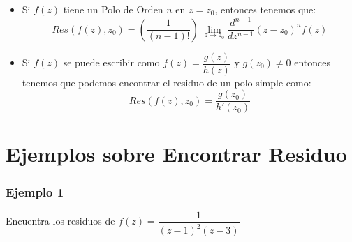 \documentclass[12pt, fleqn]{report}                             %
\newenvironment{SmallIndentation}[1][0.75em]                    %
        {\begin{adjustwidth}{#1}{}\begin{footnotesize}}             %
        {\end{footnotesize}\end{adjustwidth}}                       %
\theoremstyle{break}                                            %
\newcommand{\Wrap}[1]           {\left( #1 \right)}             %
\newcommand{\pfrac}[2]      {\Wrap{\dfrac{#1}{#2}}}             %
\newcommand \MiniUpperDerivate[2] {\dfrac{d^{#2}}{d#1^{#2}}}    %
\begin{document}
\begin{itemize}
\begin{SmallIndentation}[1em]
                        \end{SmallIndentation}


                    \item 
                        Si $f(z)$ tiene un Polo de Orden $n$ en $z = z_0$, entonces
                        tenemos que:
                        \begin{equation*}
                            Res(f(z), z_0) = \pfrac{1}{(n-1)!} \;
                                \lim_{z \to z_0} \MiniUpperDerivate{z}{n-1}(z - z_0)^n f(z)
                        \end{equation*} 


                    \item 
                        Si $f(z)$ se puede escribir como $f(z) = \dfrac{g(z)}{h(z)}$
                        y $g(z_0) \neq 0$ entonces tenemos que podemos encontrar el residuo de un
                        polo simple como:
                        \begin{equation*}
                            Res(f(z), z_0) = \dfrac{g(z_0)}{h'(z_0)}
                        \end{equation*}

                            
                \end{itemize}



            \clearpage
            \section{Ejemplos sobre Encontrar Residuo}


                \subsubsection{Ejemplo 1}

                    Encuentra los residuos de $f(z) = \dfrac{1}{(z-1)^2 (z-3)}$
\end{document}
